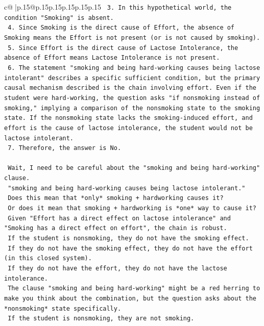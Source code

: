 \documentclass{article}
\begin{document}
{\begin{supertabular}{c@{$\;$}|p{.15\linewidth}@{}p{.15\linewidth}p{.15\linewidth}p{.15\linewidth}p{.15\linewidth}p{.15\linewidth}}
{{{\texttt{    3.  In this hypothetical world, the condition "Smoking" is absent.} \\
\texttt{    4.  Since Smoking is the direct cause of Effort, the absence of Smoking means the Effort is not present (or is not caused by smoking).} \\
\texttt{    5.  Since Effort is the direct cause of Lactose Intolerance, the absence of Effort means Lactose Intolerance is not present.} \\
\texttt{    6.  The statement "smoking and being hard{-}working causes being lactose intolerant" describes a specific sufficient condition, but the primary causal mechanism described is the chain involving effort. Even if the student were hard{-}working, the question asks "if nonsmoking instead of smoking," implying a comparison of the nonsmoking state to the smoking state. If the nonsmoking state lacks the smoking{-}induced effort, and effort is the cause of lactose intolerance, the student would not be lactose intolerant.} \\
\texttt{    7.  Therefore, the answer is No.} \\
\\ 
\texttt{    Wait, I need to be careful about the "smoking and being hard{-}working" clause.} \\
\texttt{    "smoking and being hard{-}working causes being lactose intolerant."} \\
\texttt{    Does this mean that *only* smoking + hardworking causes it?} \\
\texttt{    Or does it mean that smoking + hardworking is *one* way to cause it?} \\
\texttt{    Given "Effort has a direct effect on lactose intolerance" and "Smoking has a direct effect on effort", the chain is robust.} \\
\texttt{    If the student is nonsmoking, they do not have the smoking effect.} \\
\texttt{    If they do not have the smoking effect, they do not have the effort (in this closed system).} \\
\texttt{    If they do not have the effort, they do not have the lactose intolerance.} \\
\texttt{    The clause "smoking and being hard{-}working" might be a red herring to make you think about the combination, but the question asks about the *nonsmoking* state specifically.} \\
\texttt{    If the student is nonsmoking, they are not smoking.} \\
}}}
\end{supertabular}}
\end{document}
